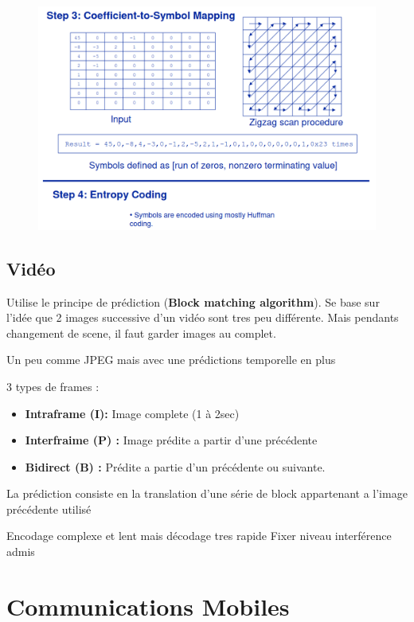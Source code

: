 \documentclass[12pt]{article}
\begin{document}
			\begin{figure}[H]
				\centering
				\includegraphics[width=\textwidth]{img/Compression/DCT3.png}

			\end{figure}
	\subsection{Vidéo}
		Utilise le principe de prédiction (\textbf{Block matching algorithm}). Se base sur l'idée que 2 images successive d'un vidéo sont tres peu différente. Mais pendants changement de scene, il faut garder images au complet.
		
		Un peu comme JPEG mais avec une prédictions temporelle en plus
		
		3 types de frames :
		\begin{itemize}
			\item \textbf{Intraframe (I):} Image complete (1 à 2sec) 
			\item \textbf{Interfraime (P) :} Image prédite a partir d'une précédente
			\item \textbf{Bidirect (B) :} Prédite  a partie d'un précédente ou suivante. 
		\end{itemize}
		
		La prédiction consiste en la translation d'une série de block appartenant a l'image précédente utilisé
		
		Encodage complexe et lent mais décodage tres rapide
			Fixer niveau interférence admis
			
\section{Communications Mobiles}
\end{document}
